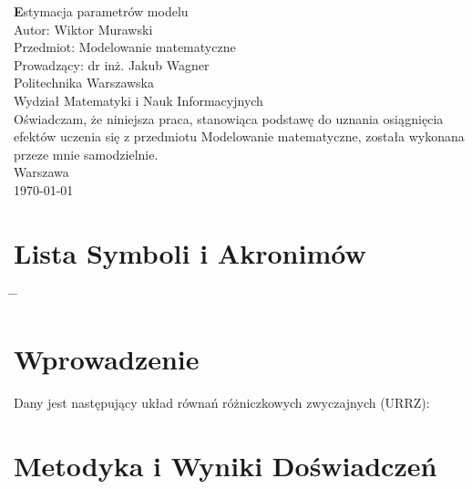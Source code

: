 \documentclass[a4paper, 12pt, twoside, openany]{article}
\date{\today}
\newcommand{\tytul}{Estymacja parametrów modelu}
\newcommand{\autor}{Wiktor Murawski}
\newcommand{\uczelnia}{Politechnika Warszawska}
\newcommand{\wydzial}{Wydział Matematyki i Nauk Informacyjnych}
\newcommand{\prowadzacy}{dr inż. Jakub Wagner}
\newcommand{\przedmiot}{Modelowanie matematyczne}
\newcommand{\miejsce}{Warszawa}
\begin{document}
	
	\begin{titlepage}
		\centering
		\vspace*{1cm}
		\LARGE\textbf \tytul \\
		\vspace{1.5cm}
		\large
		Autor: \autor \\
		\vspace{1cm}
		Przedmiot: \przedmiot \\
		Prowadzący: \prowadzacy \\
		\vspace{2cm}
		\uczelnia \\
		\wydzial \\
		\vspace{2cm}
		Oświadczam, że niniejsza praca, stanowiąca podstawę do uznania osiągnięcia efektów
		uczenia się z przedmiotu Modelowanie matematyczne, została wykonana przeze mnie samodzielnie.\\
		\vspace{2cm}
		\miejsce \\
		\today \\
	\end{titlepage}
	
	\tableofcontents
	\newpage
	
	\section{Lista Symboli i Akronimów}
	\begin{spacing}{1.5}
		\begin{tabbing}
			\hspace{5cm} \= \hspace{10cm} \= \kill
			
		\end{tabbing}
	\end{spacing}
	\newpage
	
	\section{Wprowadzenie}
	Dany jest następujący układ równań różniczkowych zwyczajnych (URRZ):
	
	\newpage
	
	\section{Metodyka i Wyniki Doświadczeń}
	
\end{document}
